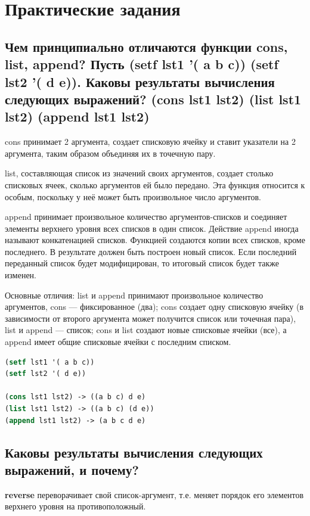 \documentclass[12pt]{report}
\begin{document}
	
\chapter{Практические задания}	

\section{Чем принципиально отличаются функции cons, list, append?
Пусть (setf lst1 '( a b c))
(setf lst2 '( d e)).
Каковы результаты вычисления следующих выражений?
 (cons lst1 lst2)
 (list lst1 lst2)
 (append lst1 lst2)}
 
cons принимает 2 аргумента, создает списковую ячейку и ставит указатели
на 2 аргумента, таким образом объединяя их в точечную пару.

list, составляющая список из значений своих аргументов, создает столько списковых ячеек, сколько аргументов ей было передано. Эта функция относится к особым, поскольку у неё может быть произвольное число аргументов.

append принимает произвольное количество аргументов-списков и соединяет элементы верхнего уровня всех списков в один список. Действие append иногда называют конкатенацией списков. Функцией создаются копии всех списков, кроме последнего. В результате должен быть построен новый список.
Если последний переданный список будет модифицирован, то  итоговый список будет также изменен.

Основные отличия: list и append принимают произвольное количество аргументов, cons --- фиксированное (два); cons создает одну списковую ячейку (в зависимости от второго аргумента может получится список или точечная пара), list и append --- список; cons и list создают новые списковые ячейки (все), а append имеет общие списковые ячейки с последним списком.


\begin{lstlisting}[language=Lisp]
(setf lst1 '( a b c))
(setf lst2 '( d e))

(cons lst1 lst2) -> ((a b c) d e)
(list lst1 lst2) -> ((a b c) (d e))
(append lst1 lst2) -> (a b c d e)

\end{lstlisting}


\section{Каковы результаты вычисления следующих выражений, и почему?}

\textbf{reverse} переворачивает свой список-аргумент, т.е. меняет порядок его элементов  верхнего уровня на противоположный.
\end{document}
